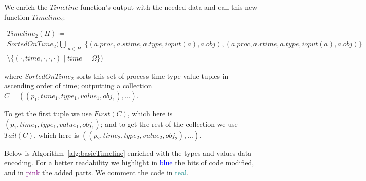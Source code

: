\documentclass[12pt]{article}
\begin{document}
\noindent We enrich the $Timeline$ function's output with the needed data and call this new function $Timeline_2$:

\begin{gather*}
Timeline_2(H) \coloneq \\
SortedOnTime_2\Big(
  \bigcup\limits_{\substack{a \in H}} 
  \big\{(a.proc, a.stime,a.type,ioput(a),a.obj),
  (a.proc,a.rtime,a.type,ioput(a),a.obj)\big\}
  \\
  \setminus \{(\cdot,time,\cdot,\cdot,\cdot)\mid time=\Omega\}
\Big)
\end{gather*}

where $SortedOnTime_2$ sorts this set of process-time-type-value tuples in ascending order of time; outputting a collection \mbox{$C=((p_1,time_1,type_1,value_1,obj_1),...)$}.

To get the first tuple we use $First(C)$, which here is $(p_1,time_1,type_1,value_1,obj_1)$; and to get the rest of the collection we use $Tail(C)$, which here is $((p_2,time_2,type_2,value_2,obj_2),...)$.

\vspace{1em}

Below is Algorithm~\autoref{alg:basicTimeline} enriched with the types and values data encoding. For a better readability we highlight in \textcolor{blue}{blue} the bits of code modified, and in \textcolor{purple}{pink} the added parts. We comment the code in \textcolor{teal}{teal}.
\end{document}
